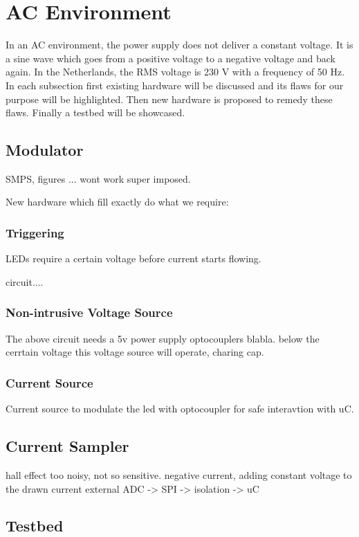 
\section{AC Environment}
\label{sec:ac-environment}

In an AC environment, the power supply does not deliver a constant voltage.
It is a sine wave which goes from a positive voltage to a negative voltage and back again.
In the Netherlands, the RMS voltage is 230 V with a frequency of 50 Hz.
In each subsection first existing hardware will be discussed and its flaws for our purpose will be highlighted.
Then new hardware is proposed to remedy these flaws.
Finally a testbed will be showcased.





\subsection{Modulator}	

SMPS, figures ... wont work super imposed.

New hardware which fill exactly do what we require:


	\subsubsection{Triggering}
	LEDs require a certain voltage before current starts flowing.

	circuit....



	\subsubsection{Non-intrusive Voltage Source}
	The above circuit needs a 5v power supply optocouplers blabla.
	below the cerrtain voltage this voltage source will operate, charing cap.


	\subsubsection{Current Source}

	Current source to modulate the led with optocoupler for safe interavtion with uC.


\subsection{Current Sampler}

hall effect too noisy, not so sensitive.
negative current, adding constant voltage to the drawn current
external ADC -> SPI -> isolation -> uC


\subsection{Testbed}

